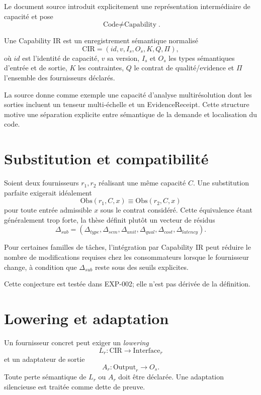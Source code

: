 Le document source introduit explicitement une représentation intermédiaire de capacité et pose
\[
\boxed{\text{Code}\neq\text{Capability}}.
\]

\begin{definition}[Capability IR]
Une Capability IR est un enregistrement sémantique normalisé
\[
\mathrm{CIR}=(id,v,I_s,O_s,K,Q,\Pi),
\]
où $id$ est l'identité de capacité, $v$ sa version, $I_s$ et $O_s$ les types sémantiques d'entrée et de sortie, $K$ les contraintes, $Q$ le contrat de qualité/evidence et $\Pi$ l'ensemble des fournisseurs déclarés.
\end{definition}

La source donne comme exemple une capacité d'analyse multirésolution dont les sorties incluent un tenseur multi-échelle et un EvidenceReceipt. Cette structure motive une séparation explicite entre sémantique de la demande et localisation du code.

\section{Substitution et compatibilité}

Soient deux fournisseurs $r_1,r_2$ réalisant une même capacité $C$. Une substitution parfaite exigerait idéalement
\[
\mathrm{Obs}(r_1,C,x)\equiv\mathrm{Obs}(r_2,C,x)
\]
pour toute entrée admissible $x$ sous le contrat considéré. Cette équivalence étant généralement trop forte, la thèse définit plutôt un vecteur de résidus
\[
\Delta_{sub}=(\Delta_{type},\Delta_{sem},\Delta_{unit},\Delta_{qual},\Delta_{cost},\Delta_{latency}).
\]

\begin{conjecture}
Pour certaines familles de tâches, l'intégration par Capability IR peut réduire le nombre de modifications requises chez les consommateurs lorsque le fournisseur change, à condition que $\Delta_{sub}$ reste sous des seuils explicites.
\end{conjecture}

Cette conjecture est testée dans EXP-002; elle n'est pas dérivée de la définition.

\section{Lowering et adaptation}

Un fournisseur concret peut exiger un \emph{lowering}
\[
L_r:\mathrm{CIR}\rightarrow\mathrm{Interface}_r
\]
et un adaptateur de sortie
\[
A_r:\mathrm{Output}_r\rightarrow O_s.
\]
Toute perte sémantique de $L_r$ ou $A_r$ doit être déclarée. Une adaptation silencieuse est traitée comme dette de preuve.

